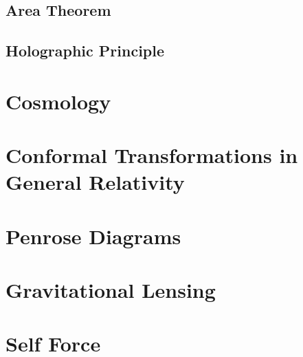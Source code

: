 \documentclass{article}
\begin{document}
\subsection{Area Theorem}

\subsection{Holographic Principle}

\section{Cosmology}




\section{Conformal Transformations in General Relativity}

\section{Penrose Diagrams}

\section{Gravitational Lensing}

\section{Self Force}
\end{document}
